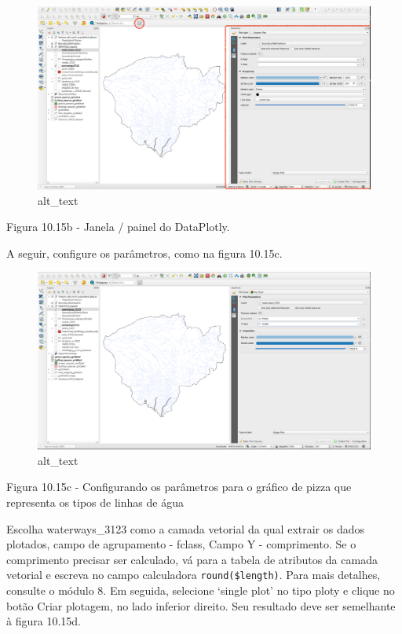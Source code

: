 \documentclass[
]{book}
\begin{document}
\begin{figure}
\centering
\includegraphics{media/modulo10/fig1015_b.png}
\caption{alt\_text}
\end{figure}

Figura 10.15b - Janela / painel do DataPlotly.

A seguir, configure os parâmetros, como na figura 10.15c.

\begin{figure}
\centering
\includegraphics{media/modulo10/fig1015_c.png}
\caption{alt\_text}
\end{figure}

Figura 10.15c - Configurando os parâmetros para o gráfico de pizza que representa os tipos de linhas de água

Escolha waterways\_3123 como a camada vetorial da qual extrair os dados plotados, campo de agrupamento - fclass, Campo Y - comprimento. Se o comprimento precisar ser calculado, vá para a tabela de atributos da camada vetorial e escreva no campo calculadora \texttt{round(\$length)}. Para mais detalhes, consulte o módulo 8. Em seguida, selecione `single plot' no tipo ploty e clique no botão Criar plotagem, no lado inferior direito. Seu resultado deve ser semelhante à figura 10.15d.
\end{document}
